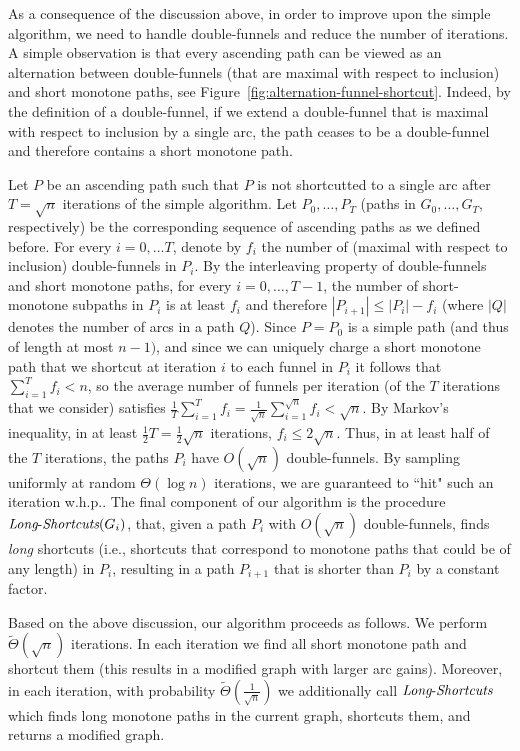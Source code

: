 \documentclass[11pt]{article}
\newcommand{\LS}{\mbox{{\it Long}-{\it Shortcuts}}}
\begin{document}
As a consequence of the  discussion above, in order to improve upon the simple algorithm, we need to handle double-funnels and reduce the number of iterations.  A simple observation is that every ascending path can be viewed as an alternation between double-funnels (that are maximal with respect to inclusion) and short monotone paths, see Figure~\ref{fig:alternation-funnel-shortcut}. Indeed, by the definition of a double-funnel, if we extend a double-funnel that is maximal with respect to inclusion by a single arc, the path  ceases to be a double-funnel and therefore contains a short monotone path.

Let $P$ be an ascending path such that $P$ is not shortcutted to a single arc after $T = \sqrt{n}$ iterations of the simple algorithm.
Let $P_0,\ldots, P_T$ (paths in $G_0,\ldots, G_T$, respectively) be the corresponding sequence of ascending paths as we defined before. For every $i=0,\ldots T$, denote by $f_i$ the number of (maximal with respect to inclusion) double-funnels in $P_i$.
By the interleaving property of double-funnels and short monotone paths, for every $i=0,\ldots, T-1$, the number of short-monotone subpaths in $P_i$ is at least $f_i$ and therefore $|P_{i+1}| \le |P_i| - f_i$ (where $|Q|$ denotes the number of arcs in a path $Q$). Since $P=P_0$ is a simple path (and thus of length at most $n-1)$, and since we can uniquely charge a  short monotone path that we shortcut at iteration $i$ to each funnel in $P_i$ it follows that $\sum_{i=1}^T f_i < n$, so the average number of funnels per iteration (of the $T$ iterations that we consider) satisfies $\frac{1}{T}\sum_{i=1}^T f_i = \frac{1}{\sqrt{n}}\sum_{i=1}^{\sqrt{n}} f_i < \sqrt{n}$. 
By Markov's inequality, in at least $\frac{1}{2}T=  \frac{1}{2}\sqrt{n}$ iterations, $f_i \le 2\sqrt{n}$. Thus, in at least half of the $T$ iterations, the paths $P_i$ have $O(\sqrt{n})$ double-funnels. By sampling uniformly at random $\Theta(\log n)$ iterations, we are guaranteed to ``hit" such an iteration w.h.p..  The final component of our algorithm is the procedure $\LS(G_i)$, that, given a path $P_i$ with $O(\sqrt{n})$ double-funnels, finds \emph{long} shortcuts (i.e., shortcuts that correspond to monotone paths that could be of any length) in $P_i$, resulting in a path $P_{i+1}$ that is shorter than $P_i$ by a constant factor.

Based on the above discussion, our algorithm proceeds as follows. We perform $\tilde{\Theta}(\sqrt{n})$ iterations. In each iteration we find all short monotone path and shortcut them (this results in a modified graph with larger arc gains). Moreover, in each iteration, with probability $\tilde{\Theta}(\frac{1}{\sqrt{n}})$ we additionally call $\LS$ which finds long monotone paths in the current graph, shortcuts them, and returns a modified graph.
\end{document}
